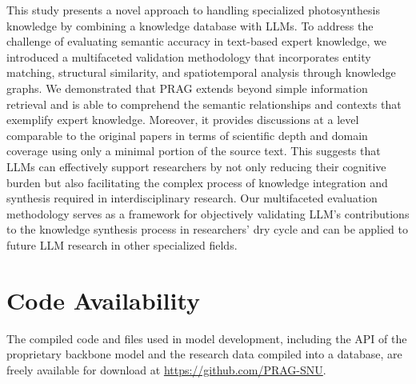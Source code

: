 \documentclass[12pt]{article}
\begin{document}
This study presents a novel approach to handling specialized photosynthesis knowledge by combining a knowledge database with LLMs. To address the challenge of evaluating semantic accuracy in text-based expert knowledge, we introduced a multifaceted validation methodology that incorporates entity matching, structural similarity, and spatiotemporal analysis through knowledge graphs. We demonstrated that PRAG extends beyond simple information retrieval and is able to comprehend the semantic relationships and contexts that exemplify expert knowledge. Moreover, it provides discussions at a level comparable to the original papers in terms of scientific depth and domain coverage using only a minimal portion of the source text. This suggests that LLMs can effectively support researchers by not only reducing their cognitive burden but also facilitating the complex process of knowledge integration and synthesis required in interdisciplinary research. Our multifaceted evaluation methodology serves as a framework for objectively validating LLM's contributions to the knowledge synthesis process in researchers' dry cycle and can be applied to future LLM research in other specialized fields.

\section{Code Availability}
The compiled code and files used in model development, including the API of the proprietary backbone model and the research data compiled into a database, are freely available for download at \url{https://github.com/PRAG-SNU}.
\end{document}
